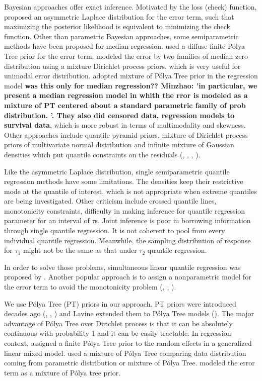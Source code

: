 \documentclass[12pt]{article}
\newcommand{\polya}{P\'{o}lya}
\begin{document}
Bayesian approaches offer exact
inference. Motivated by the loss (check) function, \citet{yu2001}
proposed an asymmetric Laplace distribution for the error term,
such that maximizing the posterior likelihood  is equivalent to
minimizing the check function. Other than parametric Bayesian
approaches, some semiparametric methods have been proposed for median
regression. \citet{walker1999}  used a diffuse finite Polya Tree prior
for the error term. \citet{kottas2001}
modeled the error by two families of median zero distribution using a 
mixture Dirichlet process priors, which is very useful for unimodal
error distribution. \citet{hanson2002}
adopted mixture of \polya{} Tree prior in the regression model {\bf was
  this only for median regression?? Minzhao: 'in particular, we
  present a median regression model in whith the rror is modeled as a
  mixture of PT centered about a standard parametric family of prob
  distribution. '. They also did censored data, regression models to
  survival data}, which is
more robust in terms of multimodality and skewness. Other approaches
include quantile pyramid priors, mixture of Dirichlet process priors
of multivariate normal distribution and infinite mixture of Gaussian
densities which put quantile constraints on the residuals
(\citet{hjort2007}, \citet{hjort2009}, \citet{kottas2009},
\citet{reich2010}). 

Like the asymmetric Laplace distribution, single semiparametric
quantile regression  methods
have some limitations. The densities keep their restrictive mode at
the quantile of interest, which is not appropriate when extreme
quantiles are being investigated. Other criticism include crossed
quantile lines, monotonicity constraints, difficulty in making
inference for quantile regression parameter for an interval of
$\tau$s. Joint inference is poor in borrowing information through
single quantile regression. It is not coherent to pool from every
individual quantile regression. Meanwhile, the sampling distribution
of response for $\tau_1$ might not be the same as that under $\tau_2$
quantile regression.

In order to solve those problems, simultaneous linear quantile
regression was proposed by \citet{tokdar2011}. 
Another popular approach is to assign a nonparametric model for the
error term to avoid the monotonicity problem (\citet{scaccia2003},
\citet{geweke2007}, \citet{taddy2010}).

We use \polya{} Tree (PT) priors in our approach. PT priors were introduced
decades ago (\citet{freedman1963}, \citet{fabius1964},
\citet{ferguson1974})  and  Lavine
extended them to \polya{} Tree models (\citet{lavine1992, lavine1994}). The
major advantage of 
\polya{} Tree over Dirichlet process is that it can be absolutely
continuous with probability 1 and it can be easily tractable. In
regression context, \citet{walker1997, walker1999} assigned a finite
\polya{} Tree 
prior to the random effects in a generalized linear mixed
model. \citet{berger2001}  used a mixture
of \polya{} Tree comparing data distribution coming from parametric
distribution or mixture of \polya{} Tree.
\citet{hanson2002} modeled the error term as a mixture of \polya{} tree
prior. 
\end{document}
